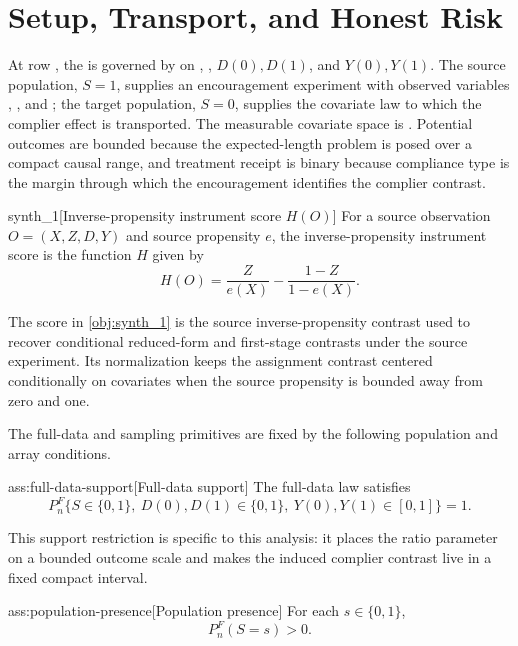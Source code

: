 \section{Setup, Transport, and Honest Risk}

At row , the  is governed by  on , , \(D(0),D(1)\), and \(Y(0),Y(1)\).  The source population, \(S=1\), supplies an encouragement experiment with observed variables , , and ; the target population, \(S=0\), supplies the covariate law to which the complier effect is transported.  The measurable covariate space is .  Potential outcomes are bounded because the expected-length problem is posed over a compact causal range, and treatment receipt is binary because compliance type is the margin through which the encouragement identifies the complier contrast.

\begin{definitionv}{synth_1}[Inverse-propensity instrument score $H(O)$]
For a source observation $O=(X,Z,D,Y)$ and source propensity $e$, the inverse-propensity instrument score is the function $H$ given by \[H(O)=\frac{Z}{e(X)}-\frac{1-Z}{1-e(X)}.\]
\end{definitionv}

The score in \cref{obj:synth_1} is the source inverse-propensity contrast used to recover conditional reduced-form and first-stage contrasts under the source experiment.  Its normalization keeps the assignment contrast centered conditionally on covariates when the source propensity  is bounded away from zero and one.

The full-data and sampling primitives are fixed by the following population and array conditions.

\begin{assumptionv}{ass:full-data-support}[Full-data support]
The full-data law satisfies
\[
P_n^F\{S\in\{0,1\},\ D(0),D(1)\in\{0,1\},\ Y(0),Y(1)\in[0,1]\}=1.
\]
\end{assumptionv}

This support restriction is specific to this analysis: it places the ratio parameter on a bounded outcome scale and makes the induced complier contrast live in a fixed compact interval.

\begin{assumptionv}{ass:population-presence}[Population presence]
For each \(s\in\{0,1\}\),
\[
P_n^F(S=s)>0.
\]
\end{assumptionv}

